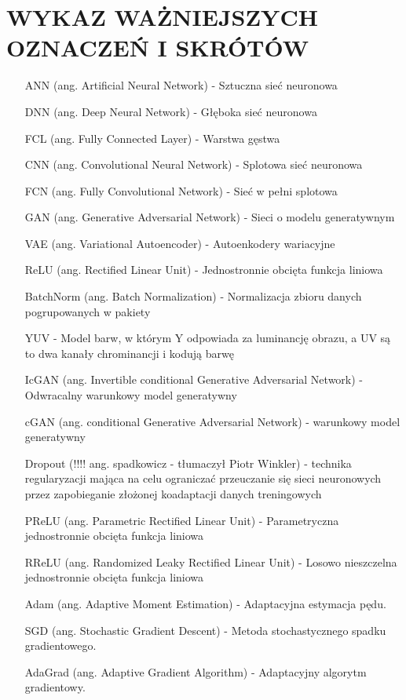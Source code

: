 \section*{WYKAZ WAŻNIEJSZYCH OZNACZEŃ I SKRÓTÓW}

  \bigskip

  \begin{itemize}
    \item[ANN] (ang. Artificial Neural Network) - Sztuczna sieć neuronowa
    \item[DNN] (ang. Deep Neural Network) - Głęboka sieć neuronowa
    \item[FCL] (ang. Fully Connected Layer) - Warstwa gęstwa
    \item[CNN] (ang. Convolutional Neural Network) - Splotowa sieć neuronowa
    \item[FCN] (ang. Fully Convolutional Network) - Sieć w pełni splotowa
    \item[GAN] (ang. Generative Adversarial Network) - Sieci o modelu generatywnym
    \item[VAE] (ang. Variational Autoencoder) - Autoenkodery wariacyjne
    \item[ReLU] (ang. Rectified Linear Unit) - Jednostronnie obcięta funkcja liniowa
    \item[BatchNorm] (ang. Batch Normalization) - Normalizacja zbioru danych
    pogrupowanych w pakiety
    \item[YUV] - Model barw, w którym Y odpowiada za luminancję obrazu, a UV
    są to dwa kanały chrominancji i kodują barwę
    \item[IcGAN] (ang. Invertible conditional Generative Adversarial Network) -
    Odwracalny warunkowy model generatywny
    \item[cGAN] (ang. conditional Generative Adversarial Network) - warunkowy
    model generatywny
    \item[Dropout] (!!!! ang. spadkowicz - tłumaczył Piotr Winkler) - technika
    regularyzacji mająca na celu ograniczać przeuczanie się sieci neuronowych
    przez zapobieganie złożonej koadaptacji danych treningowych
    \item[PReLU] (ang. Parametric Rectified Linear Unit) - Parametryczna
    jednostronnie obcięta funkcja liniowa
    \item[RReLU] (ang. Randomized Leaky Rectified Linear Unit) - Losowo nieszczelna
    jednostronnie obcięta funkcja liniowa
    \item[Adam] (ang. Adaptive Moment Estimation) - Adaptacyjna estymacja pędu.
    \item[SGD] (ang. Stochastic Gradient Descent) - Metoda stochastycznego spadku
    gradientowego.
    \item[AdaGrad] (ang. Adaptive Gradient Algorithm) - Adaptacyjny algorytm gradientowy.



  \end{itemize}
